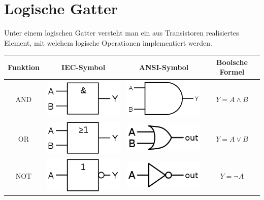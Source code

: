 \documentclass[a4paper,10pt]{report}
\begin{document}
\section{Logische Gatter}
Unter einem logischen Gatter versteht man ein aus Transistoren realisiertes Element, mit welchem logische Operationen implementiert werden.
\begin{center}\begin{tabular}{c c c c}
Funktion & IEC-Symbol & ANSI-Symbol & Boolsche Formel \\ \hline
AND & \includegraphics[scale=0.2]{imgs/gatter_IEC_AND.png} & \includegraphics[scale=0.2]{imgs/gatter_ANSI_AND.png} &  $Y = A \land B$ \\
OR & \includegraphics[scale=0.2]{imgs/gatter_IEC_OR.png} & \includegraphics[scale=0.2]{imgs/gatter_ANSI_OR.png} &  $Y = A \lor B$ \\
NOT & \includegraphics[scale=0.2]{imgs/gatter_IEC_NOT.png} & \includegraphics[scale=0.2]{imgs/gatter_ANSI_NOT.png} &  $Y = \lnot A$ \\

\end{tabular}
\end{center}
\end{document}
